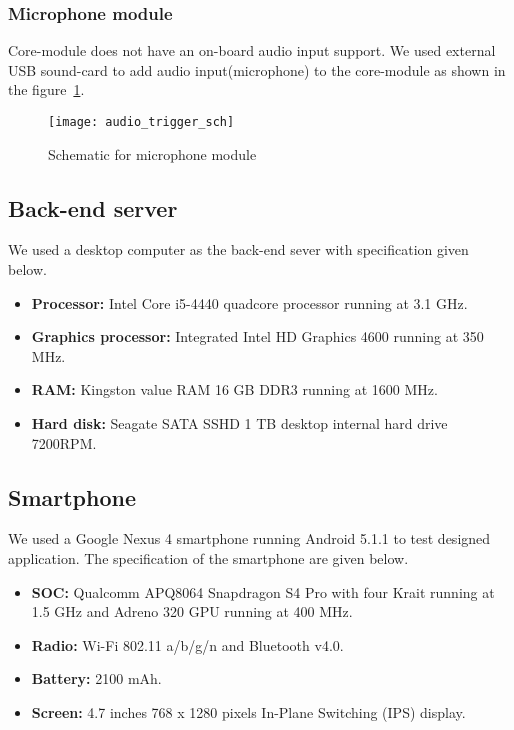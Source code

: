 \subsubsection{Microphone module}
Core-module does not have an on-board audio input support. We used external USB sound-card to add audio input(microphone) to the core-module as shown in the figure~\ref{fig:audio_trigger_sch}.%
\begin{figure}[H]
\texttt{[image: audio\_trigger\_sch]}
\caption{Schematic for microphone module}
\label{fig:audio_trigger_sch}
\end{figure}

\subsection{Back-end server}
We used a desktop computer as the back-end sever with specification given below.
\begin{itemize}
\item \textbf{Processor:} Intel\textsuperscript{\textregistered} Core\textsuperscript{\texttrademark} i5-4440 quadcore processor running at 3.1 GHz.
\item \textbf{Graphics processor:} Integrated Intel\textsuperscript{\textregistered} HD Graphics 4600 running at 350 MHz.
\item \textbf{RAM:} Kingston value RAM 16 GB DDR3 running at 1600 MHz.
\item \textbf{Hard disk:} Seagate SATA SSHD 1 TB desktop internal hard drive 7200RPM.
\end{itemize}

\subsection{Smartphone}
We used a Google Nexus 4 smartphone running Android 5.1.1 to test designed application. The specification of the smartphone are given below. 
\begin{itemize}
\item \textbf{SOC:} Qualcomm APQ8064 Snapdragon S4 Pro with four Krait running at 1.5 GHz and Adreno 320 GPU running at 400 MHz.
\item \textbf{Radio:} Wi-Fi 802.11 a/b/g/n and Bluetooth v4.0.
\item \textbf{Battery:} 2100 mAh.
\item \textbf{Screen:} 4.7 inches 768 x 1280 pixels In-Plane Switching (IPS) display.
\end{itemize}

